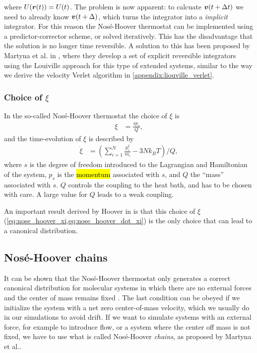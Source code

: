 where $U(\boldsymbol{r}(t)) = U(t)$. The problem is now apparent: to calcuate $\boldsymbol{v}(t+\Delta t)$ we need to already know $\boldsymbol{v}(t+\Delta)$, which turns the integrator into a \emph{implicit} integrator. For this reason the Nosé-Hoover thermostat can be implemented using a predictor-corrector scheme, or solved iteratively\cite[Appendix E.2]{frenkel2001understanding}. This has the disadvantage that the solution is no longer time reversible. A solution to this has been proposed by Martyna et al. in \cite{martyna1996explicit}, where they develop a set of explicit reversible integrators using the Louiville approach for this type of extended systems, similar to the way we derive the velocity Verlet algorithm in \cref{appendix:liouville_verlet}.

\subsubsection{Choice of $\xi$}
In the so-called Nosé-Hoover thermostat the choice of $\xi$ is
\begin{align}
    \xi             &= \frac{sp_s}{Q},\label{eq:nose_hoover_xi}
\end{align}
and the time-evolution of $\xi$ is described by
\begin{align}
    \dot\xi         &= \left( \sum_{i=1}^N \frac{p_i^2}{m_i} - 3Nk_BT \right) / Q,\label{eq:nose_hoover_dot_xi}
\end{align}
where $s$ is the degree of freedom introduced to the Lagrangian and Hamiltonian of the system, $p_s$ is the \hl{momentum} associated with $s$, and $Q$ the ``mass'' associated with $s$. $Q$ controls the coupling to the heat bath, and has to be chosen with care. A large value for $Q$ leads to a weak coupling.

An important result derived by Hoover in \cite{hoover1986constant} is that this choice of $\xi$ (\cref{eq:nose_hoover_xi,eq:nose_hoover_dot_xi}) is the only choice that can lead to a canonical distribution.



\subsection{Nosé-Hoover chains\label{sec:nose_hoover_chain}}
It can be shown that the Nosé-Hoover thermostat only generates a correct canonical distribution for molecular systems in which there are no external forces and the center of mass remains fixed \cite[Appendix B.2.1]{frenkel2001understanding}\cite{hoover1985canonical}. The last condition can be obeyed if we initialize the system with a net zero center-of-mass velocity, which we usually do in our simulations to avoid drift. If we want to simulate systems with an external force, for example to introduce flow, or a system where the center off mass is not fixed, we have to use what is called Nosé-Hoover \emph{chains}, as proposed by Martyna et al.\cite{martyna1992nose}. 

